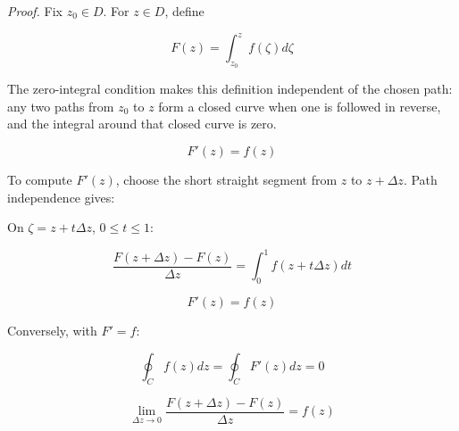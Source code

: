 \documentclass[11pt,a4paper]{article}
\theoremstyle{definition}
\theoremstyle{plain}
\begin{document}
\textit{Proof.} Fix $z_{0} \in D$. For $z \in D$, define

\begin{equation}
F(z) = \int_{z_{0}}^{z}f(\zeta)d\zeta
\end{equation}

The zero-integral condition makes this definition independent of the chosen path: any two paths from $z_{0}$ to $z$ form a closed curve when one is followed in reverse, and the integral around that closed curve is zero.

\begin{equation}
F'(z) = f(z)
\end{equation}

To compute $F'(z)$, choose the short straight segment from $z$ to $z + \Delta z$. Path independence gives:

On $\zeta = z + t\Delta z$, $0 \le t \le 1$:

\begin{equation}
\frac{F(z + \Delta z) - F(z)}{\Delta z} = \int_{0}^{1}f(z + t\Delta z)dt
\end{equation}

\[
F'(z) = f(z)
\]

Conversely, with $F'= f$:

\begin{equation}
\oint_{C}f(z)dz = \oint_{C}F'(z)dz = 0
\end{equation}

\[
\lim_{\Delta z \to 0}\frac{F(z + \Delta z) - F(z)}{\Delta z} = f(z)
\]
\end{document}
